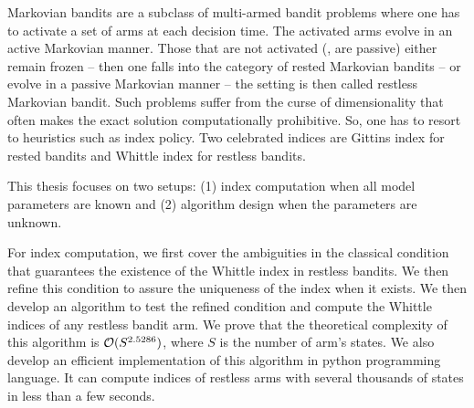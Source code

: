 Markovian bandits are a subclass of multi-armed bandit problems where one has to activate a set of arms at each decision time.
The activated arms evolve in an active Markovian manner.
Those that are not activated (\ie, are passive) either remain frozen -- then one falls into the category of rested Markovian bandits -- or evolve in a passive Markovian manner -- the setting is then called restless Markovian bandit.
Such problems suffer from the curse of dimensionality that often makes the exact solution computationally prohibitive.
So, one has to resort to heuristics such as index policy.
Two celebrated indices are Gittins index for rested bandits and Whittle index for restless bandits.

This thesis focuses on two setups: (1) index computation when all model parameters are known and (2) algorithm design when the parameters are unknown.

For index computation, we first cover the ambiguities in the classical condition that guarantees the existence of the Whittle index in restless bandits.
We then refine this condition to assure the uniqueness of the index when it exists.
We then develop an algorithm to test the refined condition and compute the Whittle indices of any restless bandit arm.
We prove that the theoretical complexity of this algorithm is $\mathcal{O}(S^{2.5286})$, where $S$ is the number of arm's states.
We also develop an efficient implementation of this algorithm in python programming language.
It can compute indices of restless arms with several thousands of states in less than a few seconds.

